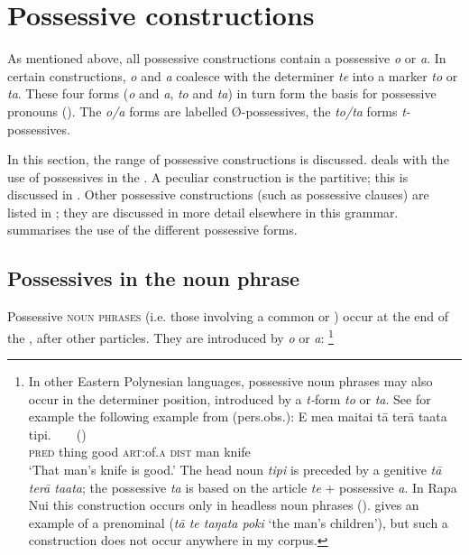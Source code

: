 \section{Possessive constructions}\label{sec:6.2}
As mentioned above, all possessive constructions contain a possessive  \textit{o} or \textit{{\ꞌ}a}. In certain constructions, \textit{o} and \textit{{\ꞌ}}\textit{a} coalesce with the determiner \textit{te} into a marker \textit{to} or \textit{ta}. These four forms (\textit{o} and \textit{{\ꞌ}a}, \textit{to} and \textit{ta}) in turn form the basis for possessive pronouns (). The \textit{o/a} forms are labelled Ø-possessives, the \textit{to/ta} forms \textit{t-}possessives.

In this section, the range of possessive constructions is discussed.  deals with the use of possessives in the . A peculiar  construction is the partitive; this is discussed in . Other possessive constructions (such as possessive clauses) are listed in ; they are discussed in more detail elsewhere in this grammar.  summarises the use of the different possessive forms.

\subsection{Possessives in the noun phrase}\label{sec:6.2.1}

Possessive \textsc{noun phrases} (i.e. those involving a common or ) occur at the end of the , after other particles. They are introduced by \textit{o} or \textit{{\ꞌ}a}:\textstyleFootnoteSymbol{} \footnote{\label{fn:284}In other Eastern Polynesian languages, possessive noun phrases may also occur in the determiner position, introduced by a \textit{t-}form \textit{to} or \textit{ta}. See for example the following example from  (pers.obs.):
\ea
\gll
E mea maita{\ꞌ}i {\ob}tā terā ta{\ꞌ}ata\,{\cb} tipi.    ~ ~ \textup{()}\\
  \textsc{pred} thing good {\db}\textsc{art}:of\textsc{.a} \textsc{dist} man knife\\
\glt 
‘That man’s knife is good.’ 
\z
The head noun \textit{tipi} is preceded by a genitive  \textit{tā terā ta{\ꞌ}ata}; the possessive  \textit{ta} is based on the article \textit{te} + possessive \textit{a}. In Rapa Nui this construction occurs only in headless noun phrases (). \citet[336]{Fischer2000Rapanui} gives an example of a prenominal   (\textit{t}\textit{ā te taŋata poki} ‘the man’s children’), but such a construction does not occur anywhere in my corpus.}

